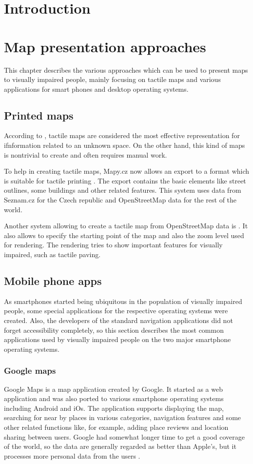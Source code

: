 \documentclass[nolof,digital]{fithesis3}
\begin{document}
\chapter{Introduction}
\chapter{Map presentation approaches}
This chapter describes the various approaches which can be used to present maps to visually impaired people, mainly focusing on tactile maps and various applications for smart phones and desktop operating systems.
\section{Printed maps}
According to \parencite{orientation_aids_from_foundations}, tactile maps are considered the most effective representation for ifnformation related to an unknown space. On the other hand, this kind of maps is nontrivial to create and often requires manual work.

To help in creating tactile maps, Mapy.cz now allows an export to a format which is suitable for tactile printing \parencite{mapycz}. The export contains the basic elements like street outlines, some buildings and other related features. This system uses data from Seznam.cz for the Czech republic and OpenStreetMap data for the rest of the world.

Another system allowing to create a tactile map from OpenStreetMap data is \parencite{tactile_osm_maps}. It also allows to specify the starting point of the map and also the zoom level used for rendering. The rendering tries to show important features for visually impaired, such as tactile paving.
\section{Mobile phone apps}
As smartphones started being ubiquitous in the population of visually impaired people, some special applications for the respective operating systems were created. Also, the developers of the standard navigation applications did not forget accessibility completely, so this section describes the most common applications used by visually impaired people on the two major smartphone operating systems.
\subsection{Google maps}
Google Maps \parencite{googlemaps} is a map application created by Google. It started as a web application and was also ported to various smartphone operating systems including Android and iOs. The application supports displaying the map, searching for near by places in various categories, navigation features and some other related functions like, for example, adding place reviews and location sharing between users. Google had somewhat longer time to get a good coverage of the world, so the data are generally regarded as better than Apple's, but it processes more personal data from the users \parencite{mapcomp}.
\end{document}
